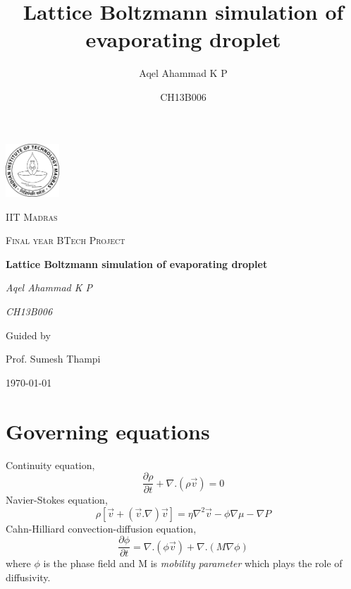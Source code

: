 \documentclass{article}
\title{Lattice Boltzmann simulation of evaporating droplet}
\date{CH13B006}
\author{Aqel Ahammad K P}
\begin{document}
\begin{titlepage}
			\centering
			\includegraphics[width=0.15\textwidth]{images/others/iitm_logo}\par\vspace{1cm}
			{\scshape\LARGE IIT Madras \par}
			\vspace{1cm}
			{\scshape\Large Final year BTech Project\par}
			\vspace{1.5cm}
			{\huge\bfseries Lattice Boltzmann simulation of evaporating droplet\par}
			\vspace{2cm}
			{\Large\itshape Aqel Ahammad K P\par}
			{\Large\itshape CH13B006\par}
			\vfill
			Guided by\par
			Prof. Sumesh Thampi
			
			\vfill
			
			{\large \today\par}
		\end{titlepage}
\tableofcontents
{}
\newpage
{}

\section{Governing equations}
Continuity equation,
\begin{equation}
	\frac{\partial \rho}{\partial t} + \nabla.(\rho \vec{v}) = 0
\label{eq:continuity}
\end{equation}
Navier-Stokes equation,
\begin{equation}
	\rho [\vec{v} + (\vec{v}.\nabla)\vec{v}] = \eta \nabla^2\vec{v}-\phi\nabla\mu - \nabla P
	\label{eq:NS}
\end{equation}
Cahn-Hilliard convection-diffusion equation,
\begin{equation}
	\frac{\partial \phi}{\partial t} = \nabla.(\phi \vec{v}) + \nabla.(M\nabla\phi)
 \label{eq:CH}
\end{equation}
where $\phi$ is the phase field and M is \textit{mobility parameter} which plays the role of diffusivity.
\end{document}
